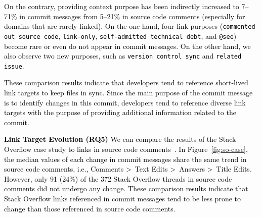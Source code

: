 \documentclass[smallextended]{svjour3}       %
\newcommand{\fix}[1]{\textcolor{black}{#1}}
\begin{document}
\fix{On the contrary, providing context purpose has been indirectly increased to 7--71\% in commit messages from 5--21\% in source code comments (especially for domains that are rarely linked). On the one hand, four link purposes (\texttt{commented-out source code}, \texttt{link-only}, \texttt{self-admitted technical debt}, and \texttt{@see}) become rare or even do not appear in commit messages. On the other hand, we also observe two new purposes, such as \texttt{version control sync} and \texttt{related issue}.}

\fix{These comparison results indicate that developers tend to reference short-lived link targets to keep files in sync. Since the main purpose of the commit message is to identify changes in this commit, developers tend to reference diverse link targets with the purpose of providing additional information related to the commit.}


\fix{\textbf{Link Target Evolution (RQ5)}
We can compare the results of the Stack Overflow case study to links in source code comments~\citep{hata20199}. In Figure~\ref{fig:so-case}, the median values of each change in commit messages share the same trend in source code comments, i.e., Comments \textgreater~Text Edits \textgreater~Answers \textgreater~Title Edits. However, only 91 (24\%) of the 372 Stack Overflow threads in source code comments did not undergo any change. \fix{These comparison results indicate that} Stack Overflow links referenced in commit messages tend to be less prone to change than those referenced in source code comments.}

\end{document}
